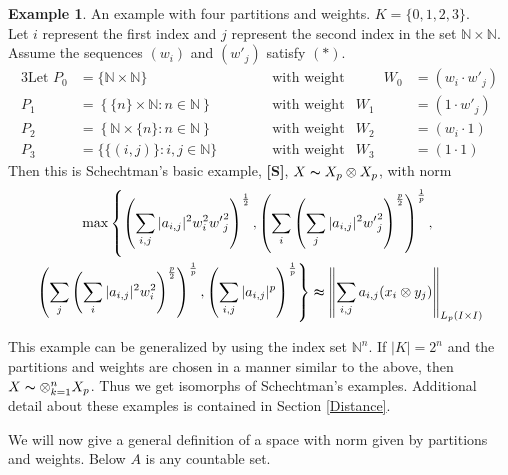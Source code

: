 \documentclass[12pt]{amsart}
\theoremstyle{definition}
\newtheorem{example}[theorem]{Example}
\theoremstyle{remark}
\numberwithin{equation}{section}
\begin{document}
\begin{example} An example with four partitions and weights.
$K=\{0,1,2,3\}$.\\
Let $i$ represent the first index and $j$
represent the second index in the set $\mathbb{N}\times \mathbb{N}$.
Assume the sequences $(w_i)$ and $(w'_j)$ satisfy $(*)$. 
\begin{alignat*}{3}
\text{Let } P_0 &=\{\mathbb N \times \mathbb N\}  &&\qquad \text{ with weight}
&\qquad W_0 &=(w_i\cdot w'_j)\\
P_1&=\left\{ \{n\} \times \mathbb{N}:n\in\mathbb N\right\}
&&\qquad \text{ with weight} & W_1&=(1\cdot w'_j)\\
P_2&=\left\{{\mathbb{N}}\times \{n\} :n\in\mathbb N\right\}
 &&\qquad \text{ with weight} & W_2&=(w_i \cdot 1)\\
P_3&= \{\{(i,j)\}:i,j\in \mathbb N\} &&\qquad \text{ with weight} &
 W_3&=(1\cdot 1)
\end{alignat*}
Then this is Schechtman's basic example, {\bf{[S]}},
$X \thicksim X_p \otimes X_p$, with norm 
\begin{multline}
\max \left\{ \left(\sum_{i,j} |a_{i,j}|^2w_{i}^{2}
{w'}_{j}^{2}\right)^{\frac{1}{2}}, \left(\sum_i\left(\sum_j |a_{i,j}|^2
{w'}_{j}^{2}\right)^{\frac{p}{2}}\right)^{\frac{1}{p}},\right .\\
\left .  \left( \sum_j \left( \sum_i
|a_{i,j}|^2 w_{i}^{2} \right)^{\frac{p}{2}} \right)^{\frac{1}{p}},
\left(\sum_{i,j} |a_{i,j}|^p \right)^{\frac{1}{p}} \right\}
\thickapprox\left\|\sum_{i,j} a_{i,j}
(x_i \otimes y_j)\right\|_{L_p(I\times I)}
\end{multline}
\end{example}

This example can be generalized by using the index set
 ${\mathbb{N}}^n$. If $|K|=2^n$ and the partitions and weights are chosen
 in a manner similar to the above, then $X\thicksim \otimes^n_{k=1}X_{p}$.
Thus we get isomorphs of Schechtman's examples. Additional detail
about these examples is contained in Section \ref{Distance}.

We will now give a general definition of a space with norm given by
partitions and weights.  Below $A$ is any countable set. 
\end{document}
